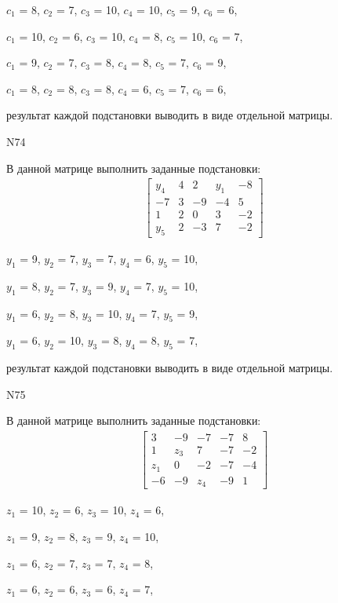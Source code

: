 \documentclass[11pt]{report}
\begin{document}
$c_{1}$ = 8, $c_{2}$ = 7, $c_{3}$ = 10, $c_{4}$ = 10, $c_{5}$ = 9, $c_{6}$ = 6, 

$c_{1}$ = 10, $c_{2}$ = 6, $c_{3}$ = 10, $c_{4}$ = 8, $c_{5}$ = 10, $c_{6}$ = 7, 

$c_{1}$ = 9, $c_{2}$ = 7, $c_{3}$ = 8, $c_{4}$ = 8, $c_{5}$ = 7, $c_{6}$ = 9, 

$c_{1}$ = 8, $c_{2}$ = 8, $c_{3}$ = 8, $c_{4}$ = 6, $c_{5}$ = 7, $c_{6}$ = 6, 

результат каждой подстановки выводить в виде отдельной матрицы.

N74

В данной матрице выполнить заданные подстановки:
\begin{align*}
\left[\begin{matrix}y_{4} & 4 & 2 & y_{1} & -8\\-7 & 3 & -9 & -4 & 5\\1 & 2 & 0 & 3 & -2\\y_{5} & 2 & -3 & 7 & -2\end{matrix}\right]
\end{align*}


$y_{1}$ = 9, $y_{2}$ = 7, $y_{3}$ = 7, $y_{4}$ = 6, $y_{5}$ = 10, 

$y_{1}$ = 8, $y_{2}$ = 7, $y_{3}$ = 9, $y_{4}$ = 7, $y_{5}$ = 10, 

$y_{1}$ = 6, $y_{2}$ = 8, $y_{3}$ = 10, $y_{4}$ = 7, $y_{5}$ = 9, 

$y_{1}$ = 6, $y_{2}$ = 10, $y_{3}$ = 8, $y_{4}$ = 8, $y_{5}$ = 7, 

результат каждой подстановки выводить в виде отдельной матрицы.

N75

В данной матрице выполнить заданные подстановки:
\begin{align*}
\left[\begin{matrix}3 & -9 & -7 & -7 & 8\\1 & z_{3} & 7 & -7 & -2\\z_{1} & 0 & -2 & -7 & -4\\-6 & -9 & z_{4} & -9 & 1\end{matrix}\right]
\end{align*}


$z_{1}$ = 10, $z_{2}$ = 6, $z_{3}$ = 10, $z_{4}$ = 6, 

$z_{1}$ = 9, $z_{2}$ = 8, $z_{3}$ = 9, $z_{4}$ = 10, 

$z_{1}$ = 6, $z_{2}$ = 7, $z_{3}$ = 7, $z_{4}$ = 8, 

$z_{1}$ = 6, $z_{2}$ = 6, $z_{3}$ = 6, $z_{4}$ = 7, 
\end{document}
